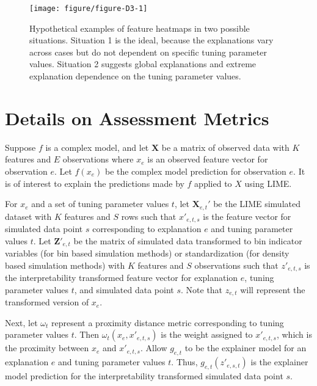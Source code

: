 \documentclass[AMS,STIX2COL]{WileyNJD-v2}\usepackage[]{graphicx}\usepackage[]{color}
\newenvironment{knitrout}{}{} %
\begin{document}
\begin{figure}[!t]
\begin{knitrout}
\color{fgcolor}

{\centering \texttt{[image: figure/figure-D3-1]} 

}



\end{knitrout}
\caption{Hypothetical examples of feature heatmaps in two possible situations.  Situation 1 is the ideal, because the explanations vary across cases but do not dependent on specific tuning parameter values. Situation 2 suggests global explanations and extreme explanation dependence on the tuning parameter values.}
\label{fig:figure-D3}
\end{figure}

\section{Details on Assessment Metrics} \label{metric-details}

Suppose $f$ is a complex model, and let $\textbf{X}$ be a matrix of observed data with $K$ features and $E$ observations where $x_e$ is an observed feature vector for observation $e$. Let $f(x_e)$ be the complex model prediction for observation $e$. It is of interest to explain the predictions made by $f$ applied to $X$ using LIME. 

For $x_e$ and a set of tuning parameter values $t$, let $\textbf{X}_{e,t}'$ be the LIME simulated dataset with $K$ features and $S$ rows such that $x'_{e,t,s}$ is the feature vector for simulated data point $s$ corresponding to explanation $e$ and tuning parameter values $t$. Let $\textbf{Z}'_{e,t}$ be the matrix of simulated data transformed to bin indicator variables (for bin based simulation methods) or standardization (for density based simulation methods) with $K$ features and $S$ observations such that $z'_{e,t,s}$ is the interpretability transformed feature vector for explanation $e$, tuning parameter values $t$, and simulated data point $s$. Note that $z_{e,t}$ will represent the  transformed version of $x_e$.

Next, let $\omega_t$ represent a proximity distance metric corresponding to tuning parameter values $t$. Then $\omega_t\left(x_e, x'_{e,t,s}\right)$ is the weight assigned to $x'_{e,t,s}$, which is the proximity between $x_e$ and $x'_{e,t,s}$. Allow $g_{e,t}$ to be the explainer model for an explanation $e$ and tuning parameter values $t$. Thus, $g_{e,t}\left(z'_{e,s,t}\right)$ is the explainer model prediction for the interpretability transformed simulated data point $s$.
\end{document}
